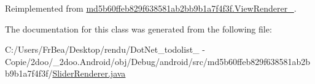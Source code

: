 Reimplemented from \hyperlink{classmd5b60ffeb829f638581ab2bb9b1a7f4f3f_1_1_view_renderer__2_6c151401977148a92c515e9c7de1aaf8}{md5b60ffeb829f638581ab2bb9b1a7f4f3f.ViewRenderer\_}.

The documentation for this class was generated from the following file:\begin{CompactItemize}
\item 
C:/Users/FrBea/Desktop/rendu/DotNet\_\-todolist\_ - Copie/2doo/\_\-2doo.Android/obj/Debug/android/src/md5b60ffeb829f638581ab2bb9b1a7f4f3f/\hyperlink{_slider_renderer_8java}{SliderRenderer.java}\end{CompactItemize}
